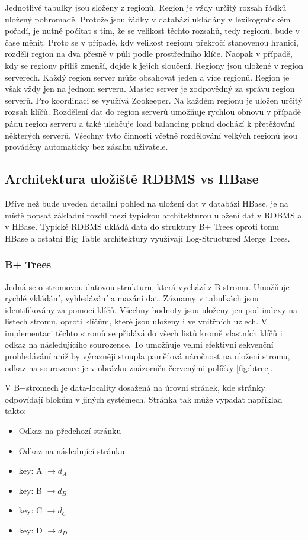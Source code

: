 \documentclass[thesis=M,czech]{FITthesis}[2012/06/26]
\begin{document}
Jednotlivé tabulky jsou složeny z regionů. Region je vždy určitý rozsah řádků uložený pohromadě. Protože jsou řádky v databázi ukládány v lexikografickém pořadí, je nutné počítat s tím, že se velikost těchto rozsahů, tedy regionů, bude v čase měnit. Proto se v případě, kdy velikost regionu překročí stanovenou hranici, rozdělí region na dva přesně v půli podle prostředního klíče. Naopak v případě, kdy se regiony příliš zmenší, dojde k jejich sloučení. Regiony jsou uložené v region serverech. Každý region server může obsahovat jeden a více regionů. Region je však vždy jen na jednom serveru. Master server je zodpovědný za správu region serverů. Pro koordinaci se využívá Zookeeper. Na každém regionu je uložen určitý rozsah klíčů. Rozdělení dat do region serverů umožňuje rychlou obnovu v případě pádu region serveru a také ulehčuje load balancing pokud dochází k přetěžování některých serverů. Všechny tyto činnosti včetně rozdělování velkých regionů jsou prováděny automaticky bez zásahu uživatele.

\subsection{Architektura uložiště RDBMS vs HBase}
Dříve než bude uveden detailní pohled na uložení dat v databázi HBase, je na místě popsat základní rozdíl mezi typickou architekturou uložení dat v RDBMS a v HBase. Typické RDBMS ukládá data do struktury B+ Trees oproti tomu HBase a ostatní Big Table architektury využívají Log-Structured Merge Trees\cite{hbase2011}.

\subsubsection{B+ Trees}
Jedná se o stromovou datovou strukturu, která vychází z B-stromu. Umožňuje rychlé vkládání, vyhledávání a mazání dat. Záznamy v tabulkách jsou identifikovány za pomoci klíčů. Všechny hodnoty jsou uloženy jen pod indexy na listech stromu, oproti klíčům, které jsou uloženy i ve vnitřních uzlech. V implementaci těchto stromů se přidává do všech listů kromě vlastních klíčů i odkaz na následujícího sourozence.\cite{efi} To umožňuje velmi efektivní sekvenční prohledávání aniž by výrazněji stoupla paměťová náročnost na uložení stromu, odkaz na sourozence je v obrázku znázorněn červenými políčky \ref{fig:btree}. 

V B+stromech je data-locality dosažená na úrovni stránek, kde stránky odpovídají blokům v jiných systémech. Stránka tak může vypadat například takto:
\begin{itemize}
	\item Odkaz na předchozí stránku
	\item Odkaz na následující stránku
	\item key: A $\rightarrow d_A$
	\item key: B $\rightarrow d_B$
	\item key: C $\rightarrow d_C$
	\item key: D $\rightarrow d_D$
\end{itemize}
\end{document}
